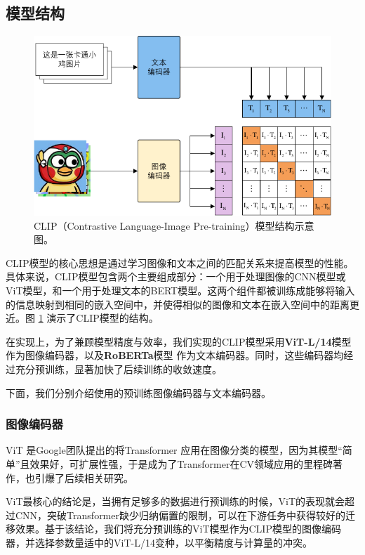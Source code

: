 \documentclass[a4paper]{zreport}
\begin{document}
\subsection{模型结构}

\begin{figure}[t]
\centering
\includegraphics[width=0.95\linewidth]{figures/clip1}
\caption{CLIP（Contrastive Language-Image Pre-training）模型结构示意图。}
\label{fig:clip1}
\end{figure}

CLIP模型的核心思想是通过学习图像和文本之间的匹配关系来提高模型的性能。具体来说，CLIP模型包含两个主要组成部分：一个用于处理图像的CNN模型或ViT模型，和一个用于处理文本的BERT模型。这两个组件都被训练成能够将输入的信息映射到相同的嵌入空间中，并使得相似的图像和文本在嵌入空间中的距离更近。图 \ref{fig:clip1} 演示了CLIP模型的结构。

在实现上，为了兼顾模型精度与效率，我们实现的CLIP模型采用\textbf{ViT-L/14}模型作为图像编码器，以及\textbf{RoBERTa}模型
作为文本编码器。同时，这些编码器均经过充分预训练，显著加快了后续训练的收敛速度。

下面，我们分别介绍使用的预训练图像编码器与文本编码器。

\subsubsection{图像编码器}

ViT \cite{dosovitskiy2020image} 是Google团队提出的将Transformer \cite{vaswani2017attention} 应用在图像分类的模型，因为其模型“简单”且效果好，可扩展性强，于是成为了Transformer在CV领域应用的里程碑著作，也引爆了后续相关研究。

ViT最核心的结论是，当拥有足够多的数据进行预训练的时候，ViT的表现就会超过CNN，突破Transformer缺少归纳偏置的限制，可以在下游任务中获得较好的迁移效果。基于该结论，我们将充分预训练的ViT模型作为CLIP模型的图像编码器，并选择参数量适中的ViT-L/14变种，以平衡精度与计算量的冲突。
\end{document}
